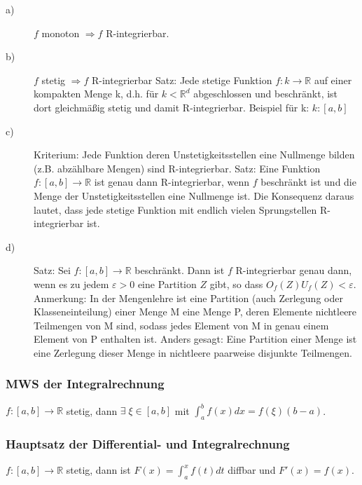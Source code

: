 \documentclass[12pt,a4paper]{article}%
\let\harvardleftorig\harvardleft
\numberwithin{equation}{section}
\newcommand{\R}{\mathbb{R}} %
\newcommand\citeVgl
{\def\harvardleft{(Vgl.\ \global\let\harvardleft\harvardleftorig}%
 \cite
}
\begin{document}
\begin{description}
\item[a)]
$f$ monoton $\Rightarrow f$ R-integrierbar.
\item[b)]
$f$ stetig $\Rightarrow f$ R-integrierbar
\newline
\glqq Satz: Jede stetige Funktion $f:k \rightarrow \R$ auf einer kompakten Menge k, d.h. für $k<\R^d$ abgeschlossen und beschränkt, ist dort gleichmäßig stetig und damit R-integrierbar.\grqq \cite{HM12}
Beispiel für k: $k:[a,b]$
\item[c)]
Kriterium: Jede Funktion deren Unstetigkeitsstellen eine Nullmenge bilden (z.B. abzählbare Mengen) sind R-integrierbar.
\glqq Satz: Eine Funktion $f:[a,b]\rightarrow \R$ ist genau dann R-integrierbar, wenn $f$ beschränkt ist und die Menge der Unstetigkeitsstellen eine Nullmenge ist. \grqq \cite{HM12}
Die Konsequenz daraus lautet, dass jede stetige Funktion mit endlich vielen Sprungstellen R-integrierbar ist. \citeVgl{HM12}
\item[d)]
\glqq Satz: Sei $f:[a,b] \rightarrow \R$ beschränkt. Dann ist $f$ R-integrierbar genau dann, wenn es zu jedem $\varepsilon > 0$ eine Partition $Z$ gibt, 
so dass
$O_f(Z)  U_f(Z) < \varepsilon$. \grqq \cite{HM12}
\newline
Anmerkung: \glqq In der Mengenlehre ist eine Partition (auch Zerlegung oder Klasseneinteilung) einer Menge M eine Menge P, deren Elemente nichtleere Teilmengen von M sind, sodass jedes Element von M in genau einem Element von P enthalten ist. Anders gesagt: Eine Partition einer Menge ist eine Zerlegung dieser Menge in nichtleere paarweise disjunkte Teilmengen.\grqq  \cite{wiki}

\end{description}

\subsubsection{MWS der Integralrechnung}
$f:[a,b]\rightarrow\R$ stetig, dann $\exists \; \xi \in[a,b]$ mit $\int_a^b f(x)dx = f(\xi)(b-a)$.

\subsubsection{Hauptsatz der Differential- und Integralrechnung}
$f:[a,b]\rightarrow\R$ stetig, dann ist $F(x) = \int_a^x f(t)dt$ diffbar und $F'(x) = f(x)$.
\end{document}
